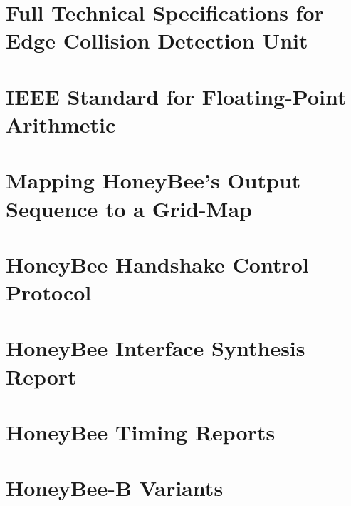 
\newpage
\section{Full Technical Specifications for Edge Collision Detection Unit}
    

\section{IEEE Standard for Floating-Point Arithmetic}
\label{section:honeybee_appendix_ieee}

\section{Mapping HoneyBee's Output Sequence to a Grid-Map}
\label{section:honeybee_appendix_mapping}

\section{HoneyBee Handshake Control Protocol}
\label{section:honeybee_appendix_handshake}
    

\section{HoneyBee Interface Synthesis Report}
\label{section:honeybee_appendix_synthesis_report}
    

\section{HoneyBee Timing Reports}
\label{section:honeybee_appendix_timing_reports}

\section{HoneyBee-B Variants}
\label{section:honeybee_appendix_hbb_variants}
